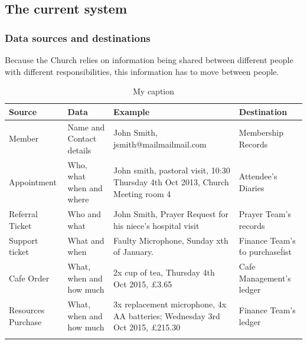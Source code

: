 \subsection{The current system}

\subsubsection{Data sources and destinations}
Because the Church relies on information being shared between different people with different responsibilities, this information has to move between people.

\begin{table}
\centering
\caption{My caption}
\label{my-label}
\begin{tabular}{llll}
\hline
\multicolumn{1}{|l|}{Source}             & \multicolumn{1}{l|}{Data}                     & \multicolumn{1}{l|}{Example}                                                                         & \multicolumn{1}{l|}{Destination}                       \\ \hline
\multicolumn{1}{|l|}{Member}             & \multicolumn{1}{l|}{Name and Contact details} & \multicolumn{1}{l|}{John Smith, jsmith@mailmailmail.com}                                             & \multicolumn{1}{l|}{Membership Records}                \\ \hline
\multicolumn{1}{|l|}{Appointment}        & \multicolumn{1}{l|}{Who, what when and where} & \multicolumn{1}{l|}{John smith, pastoral visit, 10:30 Thursday  4th Oct 2013, Church Meeting room 4} & \multicolumn{1}{l|}{Attendee's Diaries}                \\ \hline
\multicolumn{1}{|l|}{Referral Ticket}    & \multicolumn{1}{l|}{Who and what}             & \multicolumn{1}{l|}{John Smith, Prayer Request for his niece's hospital visit}                       & \multicolumn{1}{l|}{Prayer Team's records}             \\ \hline
\multicolumn{1}{|l|}{Support ticket}     & \multicolumn{1}{l|}{What and when}            & \multicolumn{1}{l|}{Faulty Microphone, Sunday xth of January.}                                       & \multicolumn{1}{l|}{Finance Team's \'to purchase\' list} \\ \hline
\multicolumn{1}{|l|}{Cafe Order}         & \multicolumn{1}{l|}{What, when and how much}  & \multicolumn{1}{l|}{2x cup of tea, Thursday 4th Oct 2015, £3.65}                                     & \multicolumn{1}{l|}{Cafe Management's ledger}          \\ \hline
\multicolumn{1}{|l|}{Resources Purchase} & \multicolumn{1}{l|}{What, when and how much}  & \multicolumn{1}{l|}{3x replacement microphone, 4x AA batteries; Wednesday 3rd Oct 2015, £215.30}     & \multicolumn{1}{l|}{Finance Team's ledger}             \\ \hline
\multicolumn{1}{|l|}{}                   & \multicolumn{1}{l|}{}                         & \multicolumn{1}{l|}{}                                                                                & \multicolumn{1}{l|}{}                                  \\ \hline

\end{tabular}
\end{table}


